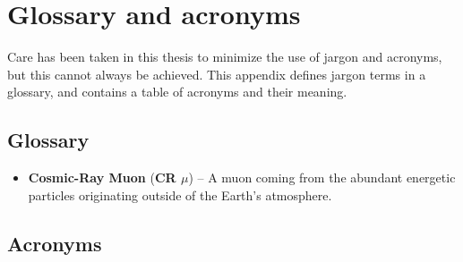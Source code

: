 \chapter{Glossary and acronyms}
\label{app_glossary}
Care has been taken in this thesis to minimize the use of jargon and
acronyms, but this cannot always be achieved.  This appendix defines
jargon terms in a glossary, and contains a table of acronyms and their
meaning.

\section{Glossary}
\label{jargonapp}
\begin{itemize}

\item \textbf{Cosmic-Ray Muon} (\textbf{CR $\mu$}) -- A muon coming from
the abundant energetic particles originating outside of the Earth's
atmosphere.

\end{itemize}

\section{Acronyms}
\label{acronymsec}


